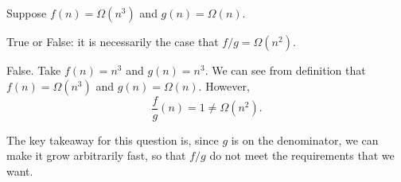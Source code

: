 \begin{prob}

    Suppose $f(n) = \Omega(n^3)$ and $g(n) = \Omega(n)$.

    True or False: it is necessarily the case that $f/g = \Omega(n^2)$.

    \tF{}

    \begin{soln}
        False. Take $f(n) = n^3$ and $g(n) = n^3$. We can see from definition that 
        $f(n) = \Omega(n^3)$ and $g(n) = \Omega(n)$. However, 
        \[ \frac{f}{g}(n) = 1 \neq \Omega(n^2). \]

        The key takeaway for this question is, since $g$ is on the denominator, we can 
        make it grow arbitrarily fast, so that $f/g$ do not meet the requirements that 
        we want.
    \end{soln}

\end{prob}
